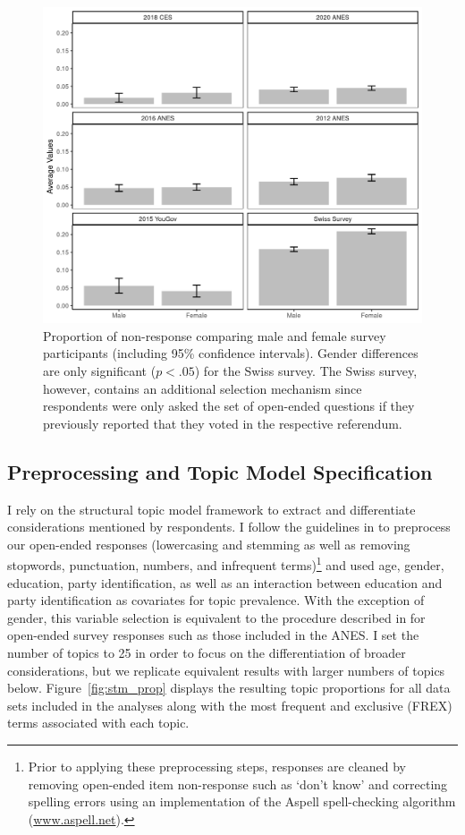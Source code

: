 \begin{figure}[ht]\centering
	\includegraphics{../fig/noresponse.png}
	\caption{Proportion of non-response comparing male and female survey participants (including 95\% confidence intervals). Gender differences are only significant ($p<.05$) for the Swiss survey. The Swiss survey, however, contains an additional selection mechanism since respondents were only asked the set of open-ended questions if they previously reported that they voted in the respective referendum.}
\end{figure}


\clearpage
\subsection{Preprocessing and Topic Model Specification}

I rely on the structural topic model framework to extract and differentiate considerations mentioned by respondents. I follow the guidelines in \citet{roberts2014structural} to preprocess our open-ended responses (lowercasing and stemming as well as removing stopwords, punctuation, numbers, and infrequent terms)\footnote{Prior to applying these preprocessing steps, responses are cleaned by removing open-ended item non-response such as `don't know' and correcting spelling errors using an implementation of the Aspell spell-checking algorithm (\url{www.aspell.net}).} and used age, gender, education, party identification, as well as an interaction between education and party identification as covariates for topic prevalence. With the exception of gender, this variable selection is equivalent to the procedure described in \citet{roberts2014structural} for open-ended survey responses such as those included in the ANES. I set the number of topics to 25 in order to focus on the differentiation of broader considerations, but we replicate equivalent results with larger numbers of topics below. Figure~\ref{fig:stm_prop} displays the resulting topic proportions for all data sets included in the analyses along with the most frequent and exclusive (FREX) terms associated with each topic.

